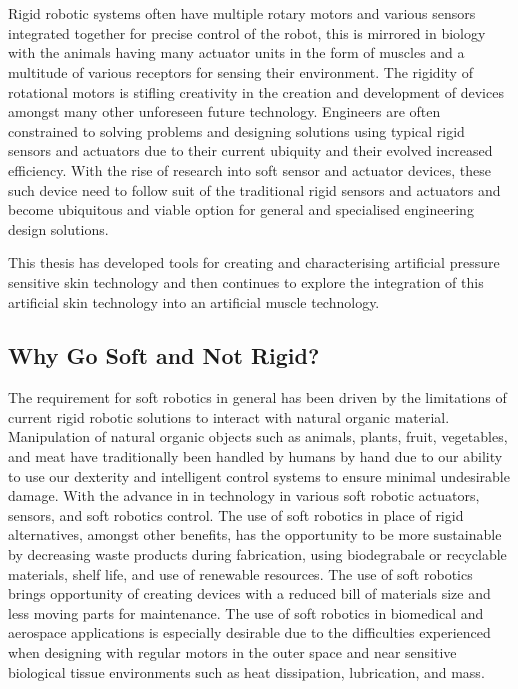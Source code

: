 \chapter{\chapiname}
\label{chapter1}
Rigid robotic systems often have multiple rotary motors and various sensors integrated together for precise control of the robot, this is mirrored in biology with the animals having many actuator units in the form of muscles and a multitude of various receptors for sensing their environment. The rigidity of rotational motors is stifling creativity in the creation and development of devices amongst many other unforeseen future technology. Engineers are often constrained to solving problems and designing solutions using typical rigid sensors and actuators due to their current ubiquity and their evolved increased efficiency. With the rise of research into soft sensor and actuator devices, these such device need to follow suit of the traditional rigid sensors and actuators and become ubiquitous and viable option for general and specialised engineering design solutions. 

This thesis has developed tools for creating and characterising artificial pressure sensitive skin technology and then continues to explore the integration of this artificial skin technology into an artificial muscle technology.



\section{Why Go Soft and Not Rigid?}
The requirement for soft robotics in general has been driven by the limitations of current rigid robotic solutions to interact with natural organic material. Manipulation of natural organic objects such as animals, plants, fruit, vegetables, and meat have traditionally been handled by humans by hand due to our ability to use our dexterity and intelligent control systems to ensure minimal undesirable damage. With the advance in in technology in various soft robotic actuators\cite{Stella2023,Zhang2023,Hartmann2021,Yasa2023, Manti2016}, sensors\cite{Hegde2023}, and soft robotics control\cite{DellaSantina2023, Armanini2023}. The use of soft robotics in place of rigid alternatives, amongst other benefits, has the opportunity to be more sustainable by decreasing waste products during fabrication, using biodegrabale or recyclable materials, shelf life, and use of renewable resources\cite{Hartmann2021}. The use of soft robotics brings opportunity of creating devices with a reduced bill of materials size and less moving parts for maintenance. The use of soft robotics in biomedical and aerospace applications is especially desirable due to the difficulties experienced when designing with regular motors in the outer space and near sensitive biological tissue environments such as heat dissipation, lubrication, and mass\cite{Murugesan1981,Ashuri2020,Branz2017,Bruschi2021}. 

